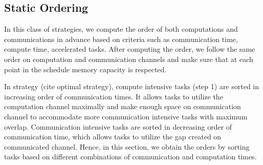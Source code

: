 \documentclass[runningheads]{llncs} %
\begin{document}
\subsection{Static Ordering}
In this class of strategies, we compute the order of both computations and communications in advance based on criteria such as communication time, compute time, accelerated tasks. After computing the order, we follow the same order on computation and communication channels and make sure that at each point in the schedule memory capacity is respected.


In strategy (cite optimal strategy), compute intensive tasks (step 1) are sorted in increasing order of communication times. It allows tasks to utilize the computation channel maximally and make enough space on communication channel to accommodate more communication intensive tasks with maximum overlap. Communication intensive tasks are sorted in decreasing order of communication time, which allows tasks to utilize the gap created on communicated channel. Hence,  in this section, we obtain the orders by sorting tasks based on different combinations of communication and computation times.
\end{document}
